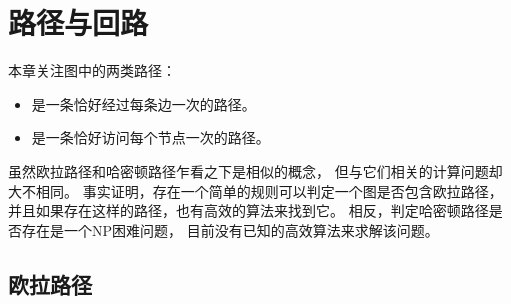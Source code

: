 \chapter{路径与回路}

本章关注图中的两类路径：
\begin{itemize}
\item {}是一条恰好经过每条边一次的路径。
\item {}是一条恰好访问每个节点一次的路径。
\end{itemize}

虽然欧拉路径和哈密顿路径乍看之下是相似的概念，
但与它们相关的计算问题却大不相同。
事实证明，存在一个简单的规则可以判定一个图是否包含欧拉路径，
并且如果存在这样的路径，也有高效的算法来找到它。
相反，判定哈密顿路径是否存在是一个NP困难问题，
目前没有已知的高效算法来求解该问题。

\section{欧拉路径}


